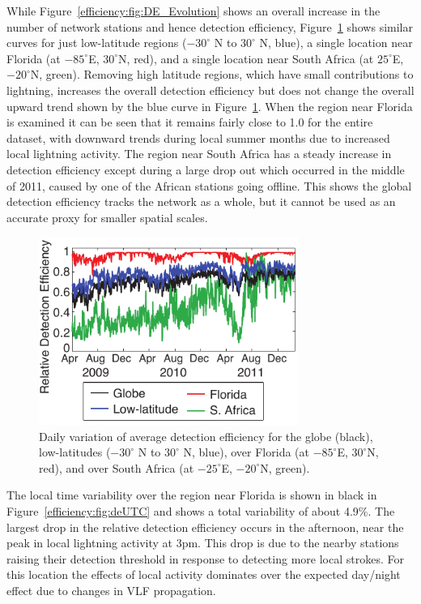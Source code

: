 While Figure~\ref{efficiency:fig:DE_Evolution} shows an overall increase in the number of network stations and hence detection efficiency, Figure~\ref{efficiency:fig:deTrendLocal} shows similar curves for just low-latitude regions ($-30^\circ$ N to $30^\circ$ N, blue), a single location near Florida (at $-85^\circ$E, $30^\circ$N, red), and a single location near South Africa (at $25^\circ$E, $-20^\circ$N, green).
Removing high latitude regions, which have small contributions to lightning, increases the overall detection efficiency but does not change the overall upward trend shown by the blue curve in Figure~\ref{efficiency:fig:deTrendLocal}.
When the region near Florida is examined it can be seen that it remains fairly close to 1.0 for the entire dataset, with downward trends during local summer months due to increased local lightning activity.
The region near South Africa has a steady increase in detection efficiency except during a large drop out which occurred in the middle of 2011, caused by one of the African stations going offline.
This shows the global detection efficiency tracks the network as a whole, but it cannot be used as an accurate proxy for smaller spatial scales.

\begin{figure}[ht!]
   \centering
\noindent\includegraphics[width=20pc]{efficiency/Figures/2012RS005049-p10.pdf}
   \caption{Daily variation of average detection efficiency for the globe (black), low-latitudes ($-30^\circ$ N to $30^\circ$ N, blue), over Florida (at $-85^\circ$E, $30^\circ$N, red), and over South Africa (at $-25^\circ$E, $-20^\circ$N, green).}
   \label{efficiency:fig:deTrendLocal}
\end{figure}

The local time variability over the region near Florida is shown in black in Figure~\ref{efficiency:fig:deUTC} and shows a total variability of about 4.9\%.
The largest drop in the relative detection efficiency occurs in the afternoon, near the peak in local lightning activity at 3pm.
This drop is due to the nearby stations raising their detection threshold in response to detecting more local strokes.
For this location the effects of local activity dominates over the expected day/night effect due to changes in VLF propagation.

